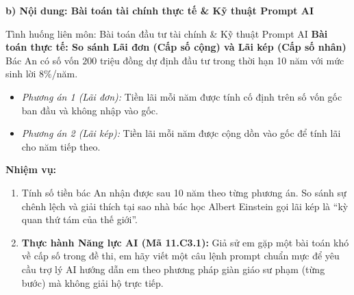 \documentclass[12pt, a4paper]{article}
\begin{document}
\noindent \textbf{b) Nội dung: Bài toán tài chính thực tế \& Kỹ thuật Prompt AI}
\begin{aibox}{Tình huống liên môn: Bài toán đầu tư tài chính \& Kỹ thuật Prompt AI}
\textbf{Bài toán thực tế: So sánh Lãi đơn (Cấp số cộng) và Lãi kép (Cấp số nhân)}
Bác An có số vốn $200$ triệu đồng dự định đầu tư trong thời hạn 10 năm với mức sinh lời $8\%$/năm.
\begin{itemize}[leftmargin=0.6cm]
    \item \textit{Phương án 1 (Lãi đơn):} Tiền lãi mỗi năm được tính cố định trên số vốn gốc ban đầu và không nhập vào gốc.
    \item \textit{Phương án 2 (Lãi kép):} Tiền lãi mỗi năm được cộng dồn vào gốc để tính lãi cho năm tiếp theo.
\end{itemize}
\textbf{Nhiệm vụ:}
\begin{enumerate}[leftmargin=0.6cm]
    \item Tính số tiền bác An nhận được sau 10 năm theo từng phương án. So sánh sự chênh lệch và giải thích tại sao nhà bác học Albert Einstein gọi lãi kép là ``kỳ quan thứ tám của thế giới''.
    \item \textbf{Thực hành Năng lực AI (Mã 11.C3.1):} Giả sử em gặp một bài toán khó về cấp số trong đề thi, em hãy viết một câu lệnh prompt chuẩn mực để yêu cầu trợ lý AI hướng dẫn em theo phương pháp giàn giáo sư phạm (từng bước) mà không giải hộ trực tiếp.
\end{enumerate}
\end{aibox}
\end{document}
